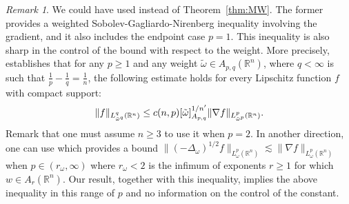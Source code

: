 \documentclass[12pt, letterpaper]{amsart}
\theoremstyle{definition}
\theoremstyle{remark}
\newtheorem{rem}[thm]{Remark}
\numberwithin{equation}{section}
\begin{document}
{\begin{rem} 
  We could have used \cite[Theorem 2.7]{lacey2010sharp} instead of Theorem~\ref{thm:MW}. The former provides a weighted Sobolev-Gagliardo-Nirenberg  inequality involving the gradient, and it also includes the endpoint case $p = 1$. This inequality is also sharp in the control of the bound with respect to the weight. More precisely, \cite[Theorem 2.7]{lacey2010sharp} establishes that for any $p \geq 1$ and any weight $\tilde{\omega} \in A_{p,q}(\mathbb{R}^n)$, where $q<\infty$ is such that $\frac{1}{p} - \frac{1}{q} = \frac{1}{n}$, the following estimate holds for every Lipschitz function $f$ with compact support:
  \begin{equation*}
  \| f \|_{L^q_{{\tilde\omega}^{q}}(\mathbb{R}^n)} \leq {c(n,p)} [\Tilde{\omega}]_{A_{p,q}}^{1/n'} \| \nabla f \|_{L^p_{\tilde\omega^p}(\mathbb{R}^n)}.
  \end{equation*}
  Remark that one must assume $n \geq 3$ to use it when $p = 2$. In another direction, one can use \cite[Proposition~6.1]{cruz2017kato} which provides a bound $\| (-\Delta_\omega )^{1/2 } f \|_{L^p_{\omega}(\mathbb{R}^n)} \lesssim \| \nabla f \|_{L^p_{\omega}(\mathbb{R}^n)}$ when $p\in (r_\omega, \infty)$ where $r_\omega<2$ is the infimum of exponents {$r\ge 1$ for which $w\in A_r(\mathbb{R}^n)$}. Our result, together with this inequality, implies the above inequality in  this range of $p$ and no information on the control of the constant. \end{rem}







}
\end{document}
